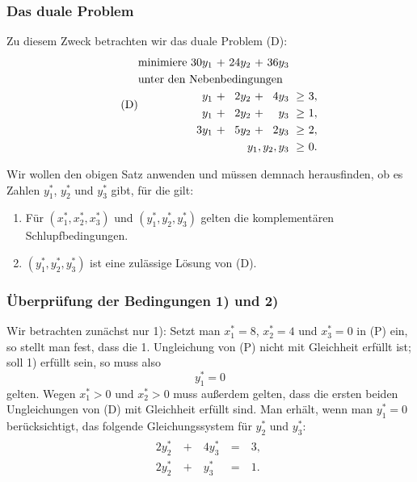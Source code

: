 \documentclass[smaller]{beamer}
\begin{document}
\begin{frame}
 \frametitle{Das duale Problem}
 Zu diesem Zweck betrachten wir das duale Problem (D): 
\begin{align}
\tag{D}
\begin{alignedat}{5}
& \text{minimiere } & 30y_1 &\ + &\ 24y_2 &\ + &\ 36y_3 & & \\
& \rlap{unter den Nebenbedingungen} & & & & & & & \\
&&  y_1 &\ + &\ 2y_2 &\ + &\ 4y_3 &\ \geq &\ 3,\ \\
&&  y_1 &\ + &\ 2y_2 &\ + &\  y_3 &\ \geq &\ 1,\ \\
&& 3y_1 &\ + &\ 5y_2 &\ + &\ 2y_3 &\ \geq &\ 2,\ \\
&& & & & & \llap{$y_1, y_2, y_3$} &\ \geq &\ 0.\
\end{alignedat}
\end{align}

Wir wollen den obigen Satz anwenden und müssen demnach herausfinden, ob es Zahlen $y_1^*$, $y_2^*$ und $y_3^*$ gibt, für die gilt:
\begin{enumerate}[1)]
\item Für $(x_1^*,x_2^*,x_3^*)$ und $(y_1^*,y_2^*,y_3^*)$ gelten die komplementären Schlupfbedingungen.
\item $(y_1^*,y_2^*,y_3^*)$ ist eine zulässige Lösung von (D).
\end{enumerate}
\end{frame}

\begin{frame}
 \frametitle{Überprüfung der Bedingungen 1) und 2)}
  \alert{Wir betrachten zunächst nur 1)}: Setzt man $x_1^*=8$, $x_2^*=4$ und $x_3^*=0$ in (P) ein, so stellt man fest, dass die 1. Ungleichung von (P) nicht mit Gleichheit erfüllt ist; soll 1) erfüllt sein, so muss also 
\[
y_1^*=0
\]
gelten. Wegen $x_1^*>0$ und $x_2^*>0$ muss außerdem gelten, dass die ersten beiden Ungleichungen von (D) mit Gleichheit erfüllt sind. Man erhält, wenn man $y_1^*=0$ berücksichtigt, das folgende Gleichungssystem für $y_2^*$ und $y_3^*$:
\begin{align}
\label{eq:7:**}
\tag{$\star\star$}
\begin{alignedat}{3}
2y_2^* &\ + &\ 4y_3^* &\ = &\ 3,\ \\
2y_2^* &\ + &\  y_3^* &\ = &\ 1.\
\end{alignedat}
\end{align}
\end{frame}
\end{document}
